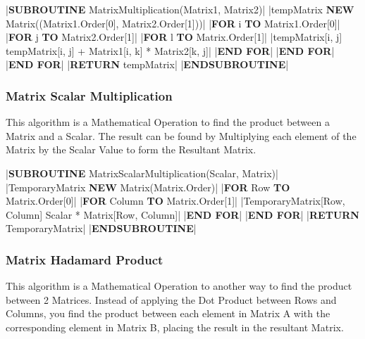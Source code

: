 \begin{flushleft}
                \vspace{0.2cm}
                \begin{pseudocode}
|\textbf{SUBROUTINE} MatrixMultiplication(Matrix1, Matrix2)|
    |tempMatrix \leftarrow \textbf{NEW} Matrix((Matrix1.Order[0], Matrix2.Order[1]))|
    |\textbf{FOR} i  \textbf{TO} Matrix1.Order[0]|
        |\textbf{FOR} j  \textbf{TO} Matrix2.Order[1]|
            |\textbf{FOR} l  \textbf{TO} Matrix.Order[1]|
                |tempMatrix[i, j] \leftarrow tempMatrix[i, j] + Matrix1[i, k] * Matrix2[k, j]|
            |\textbf{END FOR}|
        |\textbf{END FOR}|
    |\textbf{END FOR}|
    |\textbf{RETURN} tempMatrix|
|\textbf{ENDSUBROUTINE}|
                \end{pseudocode}   

                \vspace{0.5cm}
            \subsubsection{Matrix Scalar Multiplication}
                This algorithm is a Mathematical Operation to find the product between a Matrix and a Scalar.
                The result can be found by Multiplying each element of the Matrix by the Scalar Value to form the Resultant 
                Matrix.

                \vspace{0.2cm}
                \begin{pseudocode}
|\textbf{SUBROUTINE} MatrixScalarMultiplication(Scalar, Matrix)|
    |TemporaryMatrix \leftarrow \textbf{NEW} Matrix(Matrix.Order)|
    |\textbf{FOR} Row  \textbf{TO} Matrix.Order[0]|
        |\textbf{FOR} Column  \textbf{TO} Matrix.Order[1]|
            |TemporaryMatrix[Row, Column] \leftarrow Scalar * Matrix[Row, Column]|
        |\textbf{END FOR}|
    |\textbf{END FOR}|
    |\textbf{RETURN} TemporaryMatrix|
|\textbf{ENDSUBROUTINE}|
                \end{pseudocode}   
                
                \vspace{0.5cm}
            \subsubsection{Matrix Hadamard Product}
                This algorithm is a Mathematical Operation to another way to find the product between 2 Matrices. Instead of
                applying the Dot Product between Rows and Columns, you find the product between each element in Matrix A
                with the corresponding element in Matrix B, placing the result in the resultant Matrix.


\end{flushleft}
